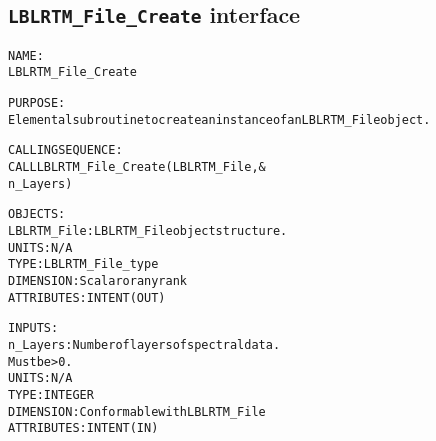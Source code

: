 \subsection{\texttt{LBLRTM\_File\_Create} interface}
  \label{sec:LBLRTM_File_Create_interface}
  \begin{alltt}
 
  NAME:
        LBLRTM_File_Create
 
  PURPOSE:
        Elemental subroutine to create an instance of an LBLRTM_File object.
 
  CALLING SEQUENCE:
        CALL LBLRTM_File_Create( LBLRTM_File, &
                                 n_Layers     )
 
  OBJECTS:
        LBLRTM_File:        LBLRTM_File object structure.
                            UNITS:      N/A
                            TYPE:       LBLRTM_File_type
                            DIMENSION:  Scalar or any rank
                            ATTRIBUTES: INTENT(OUT)
 
  INPUTS:
        n_Layers:           Number of layers of spectral data.
                            Must be > 0.
                            UNITS:      N/A
                            TYPE:       INTEGER
                            DIMENSION:  Conformable with LBLRTM_File
                            ATTRIBUTES: INTENT(IN)
 
  \end{alltt}
